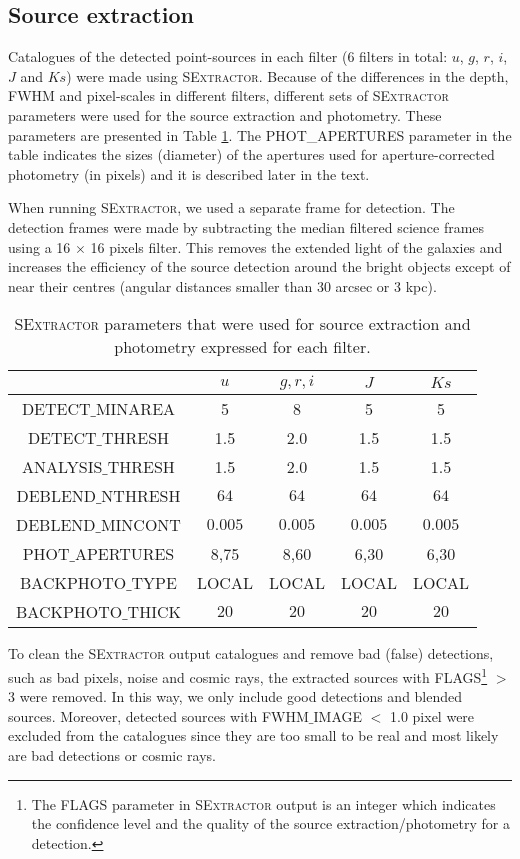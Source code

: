 \documentclass[fleqn,usenatbib]{mnras}
\begin{document}
\subsection{Source extraction}

Catalogues of the detected point-sources in each filter (6 filters in total: $u$, $g$, $r$, $i$, $J$ and $Ks$) were made using \textsc{SExtractor}. Because of the differences in the depth, FWHM and pixel-scales in different filters, different sets of \textsc{SExtractor} parameters were used for the source extraction and photometry. These parameters are presented in Table \ref{sexparams}. The PHOT\_APERTURES parameter in the table indicates the sizes (diameter) of the apertures used for aperture-corrected photometry (in pixels) and it is described later in the text.

When running \textsc{SExtractor}, we used a separate frame for detection. The detection frames were made by subtracting the median filtered science frames using a 16 $\times$ 16 pixels filter. This removes the extended light of the galaxies and increases the efficiency of the source detection around the bright objects except of near their centres (angular distances smaller than 30 arcsec or 3 kpc).

\begin{table}
\caption{\textsc{SExtractor} parameters that were used for source extraction and photometry expressed for each filter.}
\begin{tabular}{ ccccc } \hline  
 & $u$ & $g,r,i$ & $J$ & $Ks$ \\
\hline
DETECT$\_$MINAREA & 5 & 8 & 5 & 5 \\
DETECT$\_$THRESH & 1.5 & 2.0 & 1.5  & 1.5 \\
ANALYSIS$\_$THRESH & 1.5 & 2.0 & 1.5  & 1.5  \\
DEBLEND$\_$NTHRESH & $64$ & $64$ & $64$ & $64$ \\
DEBLEND$\_$MINCONT & $0.005$ & $0.005$ & $0.005$ & $0.005$ \\
PHOT$\_$APERTURES & 8,75  & 8,60 & 6,30 & 6,30 \\
BACKPHOTO$\_$TYPE & LOCAL & LOCAL & LOCAL  & LOCAL \\
BACKPHOTO$\_$THICK & $20$ & $20$ & $20$ & $20$\\
\hline
\end{tabular}
\label{sexparams}
\end{table}

To clean the \textsc{SExtractor} output catalogues and remove bad (false) detections, such as bad pixels, noise and cosmic rays, the extracted sources with FLAGS\footnote{The FLAGS parameter in \textsc{SExtractor} output is an integer which indicates the confidence level and the quality of the source extraction/photometry for a detection.} $>$ 3 were removed. In this way, we only include good detections and blended sources. Moreover, detected sources with FWHM$\_$IMAGE $<$ 1.0 pixel were excluded from the catalogues since they are too small to be real and most likely are bad detections or cosmic rays.
\end{document}
